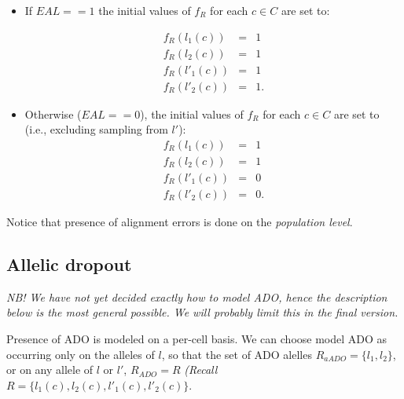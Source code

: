 \documentclass[a4paper,11pt]{article}
\begin{document}
\begin{itemize}
\item If $EAL==1$ the initial values of $f_R$ for each $c\in C$ are set
  to:

\begin{eqnarray}
  f_R(l_1(c)) &=& 1\\
  f_R(l_2(c)) &=& 1\\
  f_R(l'_1(c)) &=& 1\\
  f_R(l'_2(c)) &=& 1.
\end{eqnarray}
\item Otherwise ($EAL==0$), the initial values of $f_R$ for each $c\in C$ are
set to (i.e., excluding sampling from $l'$):
\begin{eqnarray}
  f_R(l_1(c)) &=& 1\\
  f_R(l_2(c)) &=& 1\\
  f_R(l'_1(c)) &=& 0\\
  f_R(l'_2(c)) &=& 0.
\end{eqnarray}
\end{itemize}
Notice that presence of alignment errors is done on the \emph{population level}.

\subsection{Allelic dropout}
\label{sec:allelic-dropout}
\textit{NB! We have not yet decided exactly how to model ADO, hence the
  description below is the most general possible. We will probably
  limit this in the final version.}

Presence of ADO is modeled on a per-cell basis. We can choose model ADO as occurring only on the alleles of $l$, so that the set of ADO alelles $R_{aADO} = \{l_1,l_2\}$,  or on any allele of $l$ or $l'$,  $R_{ADO}=R$ \emph{(Recall $R=\{l_1(c),l_2(c),l'_1(c),l'_2(c)\}$}.
\end{document}
